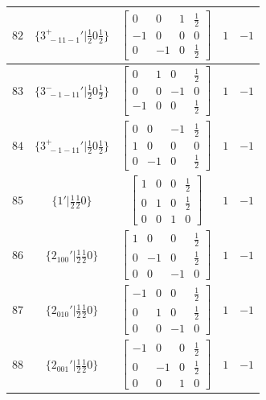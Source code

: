 \documentclass[fleqn,8pt]{jsarticle}
\begin{document}
\begin{longtable}{ccccc}
$ 82 $ & $ \{3^{+}_{\,\,-11-1}{}'|\frac{1}{2} 0 \frac{1}{2}\} $ & $ \begin{bmatrix} 0 & 0 & 1 & \frac{1}{2} \\ -1 & 0 & 0 & 0 \\ 0 & -1 & 0 & \frac{1}{2} \end{bmatrix} $ & $ 1 $ & $ -1 $ \\ \hline
$ 83 $ & $ \{3^{-}_{\,\,-1-11}{}'|\frac{1}{2} 0 \frac{1}{2}\} $ & $ \begin{bmatrix} 0 & 1 & 0 & \frac{1}{2} \\ 0 & 0 & -1 & 0 \\ -1 & 0 & 0 & \frac{1}{2} \end{bmatrix} $ & $ 1 $ & $ -1 $ \\ \hline
$ 84 $ & $ \{3^{+}_{\,\,-1-11}{}'|\frac{1}{2} 0 \frac{1}{2}\} $ & $ \begin{bmatrix} 0 & 0 & -1 & \frac{1}{2} \\ 1 & 0 & 0 & 0 \\ 0 & -1 & 0 & \frac{1}{2} \end{bmatrix} $ & $ 1 $ & $ -1 $ \\ \hline
$ 85 $ & $ \{1{}'|\frac{1}{2} \frac{1}{2} 0\} $ & $ \begin{bmatrix} 1 & 0 & 0 & \frac{1}{2} \\ 0 & 1 & 0 & \frac{1}{2} \\ 0 & 0 & 1 & 0 \end{bmatrix} $ & $ 1 $ & $ -1 $ \\ \hline
$ 86 $ & $ \{2{}_{100}{}'|\frac{1}{2} \frac{1}{2} 0\} $ & $ \begin{bmatrix} 1 & 0 & 0 & \frac{1}{2} \\ 0 & -1 & 0 & \frac{1}{2} \\ 0 & 0 & -1 & 0 \end{bmatrix} $ & $ 1 $ & $ -1 $ \\ \hline
$ 87 $ & $ \{2{}_{010}{}'|\frac{1}{2} \frac{1}{2} 0\} $ & $ \begin{bmatrix} -1 & 0 & 0 & \frac{1}{2} \\ 0 & 1 & 0 & \frac{1}{2} \\ 0 & 0 & -1 & 0 \end{bmatrix} $ & $ 1 $ & $ -1 $ \\ \hline
$ 88 $ & $ \{2{}_{001}{}'|\frac{1}{2} \frac{1}{2} 0\} $ & $ \begin{bmatrix} -1 & 0 & 0 & \frac{1}{2} \\ 0 & -1 & 0 & \frac{1}{2} \\ 0 & 0 & 1 & 0 \end{bmatrix} $ & $ 1 $ & $ -1 $ \\ \hline

\end{longtable}
\end{document}
